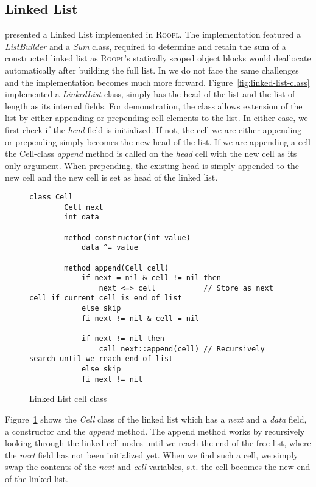 \subsection{Linked List}
\label{subsec:linked-list}
\citeauthor{th:roopl} presented a Linked List implemented in \textsc{Roopl}. The implementation featured a \textit{ListBuilder} and a \textit{Sum} class, required to determine and retain the sum of a constructed linked list as \textsc{Roopl}'s statically scoped object blocks would deallocate automatically after building the full list. In \rooplpp we do not face the same challenges and the implementation becomes much more forward. Figure~\ref{fig:linked-list-class} implemented a \textit{LinkedList} class, simply has the head of the list and the list of length as its internal fields. For demonstration, the class allows extension of the list by either appending or prepending cell elements to the list. In either case, we first check if the \textit{head} field is initialized. If not, the cell we are either appending or prepending simply becomes the new head of the list. If we are appending a cell the Cell-class \textit{append} method is called on the \textit{head} cell with the new cell as its only argument. When prepending, the existing head is simply appended to the new cell and the new cell is set as head of the linked list.

\begin{figure}[ht!]
    \centering
    \begin{lstlisting}[style = basic, language = roopl] 
    class Cell
        Cell next
        int data
    
        method constructor(int value)
            data ^= value     
    
        method append(Cell cell)
            if next = nil & cell != nil then
                next <=> cell           // Store as next cell if current cell is end of list
            else skip
            fi next != nil & cell = nil
    
            if next != nil then
                call next::append(cell) // Recursively search until we reach end of list
            else skip
            fi next != nil
    \end{lstlisting}
    \caption{Linked List cell class}
    \label{fig:linked-list-cell-class}
\end{figure}

Figure~\ref{fig:linked-list-cell-class} shows the \textit{Cell} class of the linked list which has a \textit{next} and a \textit{data} field, a constructor and the \textit{append} method. The append method works by recursively looking through the linked cell nodes until we reach the end of the free list, where the \textit{next} field has not been initialized yet. When we find such a cell, we simply swap the contents of the \textit{next} and \textit{cell} variables, s.t. the cell becomes the new end of the linked list. 

